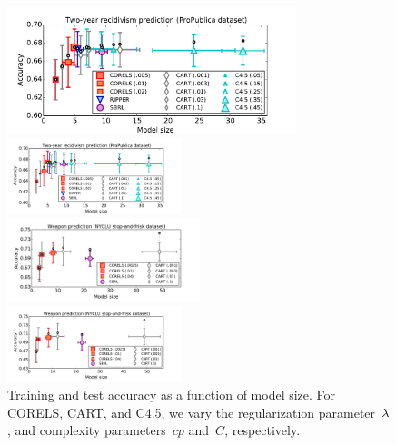 \begin{figure}[t!]
\begin{center}
\begin{arxiv}
\includegraphics[width=0.75\textwidth]{figs/compas-sparsity-training.pdf}
\end{arxiv}
\begin{kdd}
\includegraphics[trim={10mm, 0mm, 20mm, 5mm}, width=0.45\textwidth]{figs/compas-sparsity-training.pdf}
\end{kdd}
\begin{arxiv}
\includegraphics[width=0.5\textwidth]{figs/frisk-sparsity-training.pdf}
\end{arxiv}
\begin{kdd}
\includegraphics[trim={10mm, 10mm, 20mm, 1mm}, width=0.45\textwidth]{figs/frisk-sparsity-training.pdf}
\end{kdd}
\end{center}
\caption{Training and test accuracy as a function of model size.
%
For CORELS, CART, and C4.5, we vary the regularization parameter~${\lambda}$,
and complexity parameters~$cp$ and~$C$, respectively.
}
\end{figure}
